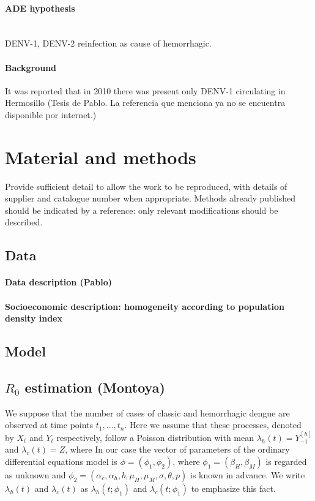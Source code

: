 \documentclass{imammb}
\numberwithin{equation}{section}
\begin{document}
    \paragraph{ADE hypothesis}
     \\
     \ac{DENV-1}, \ac{DENV-2}
     reinfection as cause of hemorrhagic.
		\paragraph{Background}
        It was reported that in 2010 there was present only DENV-1 circulating in Hermosillo (Tesis de Pablo. La referencia que menciona ya no se encuentra disponible por internet.) 
	\section{Material and methods}
		Provide sufficient detail to allow the work to be 
		reproduced, with details of supplier and catalogue 
		number when appropriate. Methods already published 
		should be indicated by a reference: only relevant 
		modifications should be described.
		\subsection{Data}
		    \label{sec:Intro}
			\paragraph{Data description (Pablo)}
			\paragraph{Socioeconomic description: 
            	homogeneity according to population density index}
		\subsection*{Model}
			
			
			
		\subsection{$R_0$ estimation (Montoya)}
		We suppose that the number of cases of classic and hemorrhagic dengue are observed at time points $t_{1}, \dots , t_{n}$. Here we assume that these processes, denoted by $X_{t}$ and $Y_{t}$ respectively, follow a Poisson distribution with mean $\lambda_{h}\left(t\right)=Y_{-1}^{[h]}$ and $\lambda_{c}\left(t\right)=Z$, where
    In our case the vector of parameters of the ordinary differential equations model is $\phi=\left(\phi_{1},\phi_{2}\right)$, where $\phi_{1}=\left(\beta_{H},\beta_{M}\right)$ is regarded as unknown and 
 $\phi_{2}=\left(\alpha_{c},\alpha_{h},b,\mu_{H},\mu_{M},\sigma,\theta,p\right)$ is known in advance. We write $\lambda_{h}\left(t\right)$ and $\lambda_{c}\left(t\right)$ as $\lambda_{h}\left(t;\phi_{1}\right)$ and $\lambda_{c}\left(t;\phi_{1}\right)$ to emphasize this fact.
 
\end{document}
